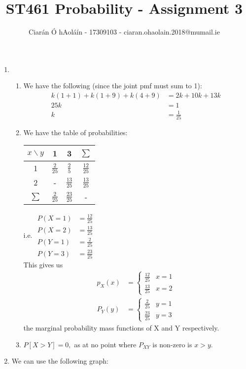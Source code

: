 \documentclass{article}
\title{ST461 Probability - Assignment 3}
\author{Ciarán Ó hAoláín - 17309103 - ciaran.ohaolain.2018@mumail.ie}
\makeatletter
\theoremstyle{definition}
\theoremstyle{remark}
\theoremstyle{example}
\newcommand{\skipitems}[1]{%
	\addtocounter{\@enumctr}{#1}%
}
\makeatother
\begin{document}
	\maketitle
	\begin{enumerate}
		\item \begin{enumerate}
			\item We have the following (since the joint pmf must sum to 1): \begin{align*}
				k(1+1)+k(1+9)+k(4+9) &= 2k+10k+13k\\
				25k &= 1\\
				k&=\frac{1}{25}
			\end{align*}
			\item We have the table of probabilities:
			\begin{tabular}{ c | c c | c}
				${x \backslash y}$ & 1 & 3 & $\sum$\\
				\hline
				1 & $\frac{2}{25}$ & $\frac{2}{5}$ & $\frac{12}{25}$\\
				2 & - & $\frac{13}{25}$ & $\frac{13}{25}$ \\
				\hline
				$\sum$ & $\frac{2}{25}$ & $\frac{23}{25}$ & -				
			\end{tabular}
			\qquad \qquad  i.e. $\begin{aligned}
				P(X=1)&=\frac{12}{25}\\
				P(X=2)&=\frac{13}{25}\\
				P(Y=1)&=\frac{2}{25}\\
				P(Y=3)&=\frac{23}{25}
			\end{aligned}	$	\\
			This gives us \begin{align*}
				p_X(x)&=
				\begin{cases}
					\frac{12}{25} & x=1\\
					\frac{13}{25} & x=2
				\end{cases}\\
				P_Y(y)&=
				\begin{cases}
					\frac{2}{25} & y=1\\
					\frac{23}{25} & y=3
				\end{cases}
			\end{align*}
			 the marginal probability mass functions of X and Y respectively.
			 \item $P[X>Y]=0,$ as at no point where $P_{XY}$ is non-zero is $x>y$.
		\end{enumerate}
		\skipitems{2}
		\item We can use the following graph:
		\begin{center}
			

\end{center}
\end{enumerate}
\end{document}
